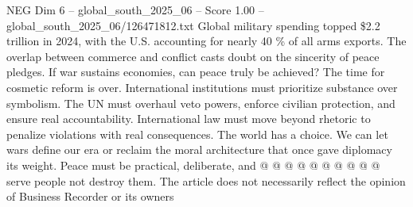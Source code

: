 \begin{textsample}{NEG Dim 6 – global\_south\_2025\_06 – Score 1.00 – global\_south\_2025\_06/126471812.txt}
Global military spending topped \$2.2 trillion in 2024, with the U.S. accounting for nearly 40 \% of all arms exports.
The overlap between commerce and conflict casts doubt on the sincerity of peace pledges.
If war sustains economies, can peace truly be achieved?
The time for cosmetic reform is over.
International institutions must prioritize substance over symbolism.
The UN must overhaul veto powers, enforce civilian protection, and ensure real accountability.
International law must move beyond rhetoric to penalize violations with real consequences.
The world has a choice.
We can let wars define our era or reclaim the moral architecture that once gave diplomacy its weight.
Peace must be practical, deliberate, and @ @ @ @ @ @ @ @ @ @ serve people not destroy them.
The article does not necessarily reflect the opinion of Business Recorder or its owners

\end{textsample}

